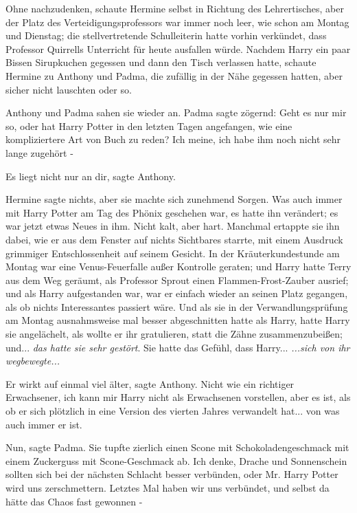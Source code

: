 Ohne nachzudenken, schaute Hermine selbst in Richtung des Lehrertisches, aber
der Platz des Verteidigungsprofessors war immer noch leer, wie schon am Montag
und Dienstag; die stellvertretende Schulleiterin hatte vorhin verkündet, dass
Professor Quirrells Unterricht für heute ausfallen würde. Nachdem Harry ein paar
Bissen Sirupkuchen gegessen und dann den Tisch verlassen hatte, schaute Hermine
zu Anthony und Padma, die zufällig in der Nähe gegessen hatten, aber sicher
nicht lauschten oder so.

Anthony und Padma sahen sie wieder an. Padma sagte zögernd: \glqq Geht es nur
mir so, oder hat Harry Potter in den letzten Tagen angefangen, wie eine
kompliziertere Art von Buch zu reden? Ich meine, ich habe ihm noch nicht sehr
lange zugehört -\grqq{}

\glqq Es liegt nicht nur an dir\grqq{}, sagte Anthony.

Hermine sagte nichts, aber sie machte sich zunehmend Sorgen. Was auch immer mit
Harry Potter am Tag des Phönix geschehen war, es hatte ihn verändert; es war
jetzt etwas Neues in ihm. Nicht kalt, aber hart. Manchmal ertappte sie ihn
dabei, wie er aus dem Fenster auf nichts Sichtbares starrte, mit einem Ausdruck
grimmiger Entschlossenheit auf seinem Gesicht. In der Kräuterkundestunde am
Montag war eine Venus-Feuerfalle außer Kontrolle geraten; und Harry hatte Terry
aus dem Weg geräumt, als Professor Sprout einen Flammen-Frost-Zauber ausrief;
und als Harry aufgestanden war, war er einfach wieder an seinen Platz gegangen,
als ob nichts Interessantes passiert wäre. Und als sie in der
Verwandlungsprüfung am Montag ausnahmsweise mal besser abgeschnitten hatte als
Harry, hatte Harry sie angelächelt, als wollte er ihr gratulieren, statt die
Zähne zusammenzubeißen; und... \emph{das hatte sie sehr gestört}. Sie hatte das
Gefühl, dass Harry...\emph{ ...sich von ihr wegbewegte...}

\glqq Er wirkt auf einmal viel älter\grqq{}, sagte Anthony. \glqq Nicht wie ein
richtiger Erwachsener, ich kann mir Harry nicht als Erwachsenen vorstellen, aber
es ist, als ob er sich plötzlich in eine Version des vierten Jahres verwandelt
hat... von was auch immer er ist.\grqq{}

\glqq Nun\grqq{}, sagte Padma. Sie tupfte zierlich einen Scone mit
Schokoladengeschmack mit einem Zuckerguss mit Scone-Geschmack ab. \glqq Ich
denke, Drache und Sonnenschein sollten sich bei der nächsten Schlacht besser
verbünden, oder Mr. Harry Potter wird uns zerschmettern. Letztes Mal haben wir
uns verbündet, und selbst da hätte das Chaos fast gewonnen -\grqq{}

